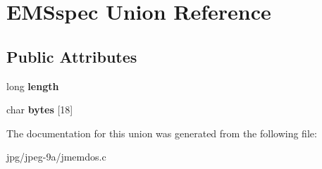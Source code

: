 \hypertarget{union_e_m_sspec}{\section{E\+M\+Sspec Union Reference}
\label{union_e_m_sspec}
}
\subsection*{Public Attributes}
\begin{DoxyCompactItemize}
\item 
\hypertarget{union_e_m_sspec_a1517bb518ee6f43cbe194e51ffefe4b9}{long {\bfseries length}}\label{union_e_m_sspec_a1517bb518ee6f43cbe194e51ffefe4b9}

\item 
\hypertarget{union_e_m_sspec_a69e61660d94ef2e7b6363e9b26b2b675}{char {\bfseries bytes} \mbox{[}18\mbox{]}}\label{union_e_m_sspec_a69e61660d94ef2e7b6363e9b26b2b675}

\end{DoxyCompactItemize}


The documentation for this union was generated from the following file\+:\begin{DoxyCompactItemize}
\item 
jpg/jpeg-\/9a/jmemdos.\+c\end{DoxyCompactItemize}
